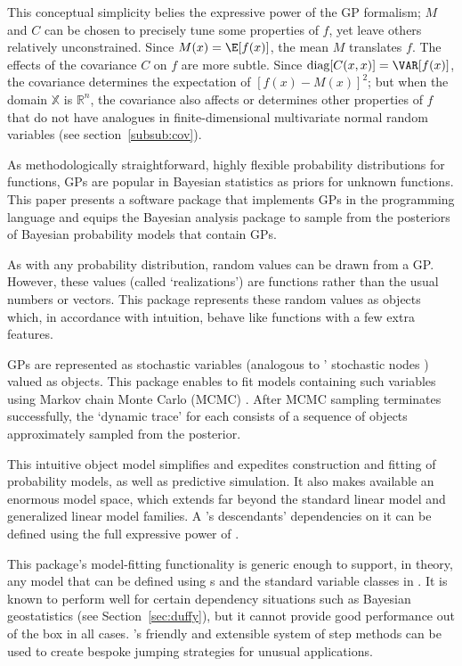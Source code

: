 \documentclass[article]{jss}
\begin{document}
This conceptual simplicity belies the expressive power of the GP formalism; $M$ and $C$ can be chosen to precisely tune some properties of $f$, yet leave others relatively unconstrained. Since $M(x)=\E[f(x)]$, the mean $M$ translates $f$. The effects of the covariance $C$ on $f$ are more subtle. Since $\textup{diag}[C(x,x)]=\VAR[f(x)]$, the covariance determines the expectation of $[f(x)-M(x)]^2$; but when the domain $\mathbb X$ is $\mathbb R^n$, the covariance also affects or determines other properties of $f$ that do not have analogues in finite-dimensional multivariate normal random variables (see section~\ref{subsub:cov}).

As methodologically straightforward, highly flexible probability distributions for functions, GPs are popular in Bayesian statistics as priors for unknown functions. This paper presents a software package that implements GPs in the programming language  and equips the Bayesian analysis package  \cite{pymc} to sample from the posteriors of Bayesian probability models that contain GPs. 

\bigskip
As with any probability distribution, random values can be drawn from a GP. However, these values (called `realizations') are functions rather than the usual numbers or vectors. This package represents these random values as  objects which, in accordance with intuition, behave like  functions with a few extra features. 

GPs are represented as  stochastic variables (analogous to ' stochastic nodes \citep{bugs}) valued as  objects. This package enables  to fit models containing such variables using Markov chain Monte Carlo (MCMC) \citep{gamerman}. After MCMC sampling terminates successfully, the `dynamic trace' for each  consists of a sequence of  objects approximately sampled from the posterior.

This intuitive object model simplifies and expedites construction and fitting of probability models, as well as predictive simulation. It also makes available an enormous model space, which extends far beyond the standard linear model and generalized linear model families. A 's descendants' dependencies on it can be defined using the full expressive power of .

This package's model-fitting functionality is generic enough to support, in theory, any model that can be defined using s and the standard variable classes in . It is known to perform well for certain dependency situations such as Bayesian geostatistics (see Section~\ref{sec:duffy}), but it cannot provide good performance out of the box in all cases. 's friendly and extensible system of step methods can be used to create bespoke jumping strategies for unusual applications.
\end{document}
